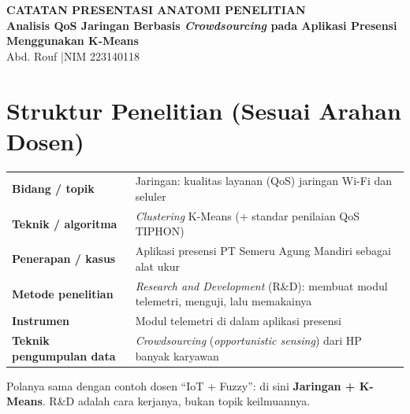 \documentclass[11pt,a4paper]{article}
\begin{document}
\begin{center}
{\Large\bfseries\color{head} CATATAN PRESENTASI ANATOMI PENELITIAN}\\[5pt]
{\bfseries Analisis QoS Jaringan Berbasis \textit{Crowdsourcing} pada Aplikasi Presensi Menggunakan K-Means}\\[6pt]
Abd. Rouf \quad|\quad NIM 223140118
\end{center}

\section{Struktur Penelitian (Sesuai Arahan Dosen)}
\begin{tabular}{@{}lp{11.5cm}@{}}
\textbf{Bidang / topik} & Jaringan: kualitas layanan (QoS) jaringan Wi-Fi dan seluler\\
\textbf{Teknik / algoritma} & \textit{Clustering} K-Means (+ standar penilaian QoS TIPHON)\\
\textbf{Penerapan / kasus} & Aplikasi presensi PT Semeru Agung Mandiri sebagai alat ukur\\
\textbf{Metode penelitian} & \textit{Research and Development} (R\&D): membuat modul telemetri, menguji, lalu memakainya\\
\textbf{Instrumen} & Modul telemetri di dalam aplikasi presensi\\
\textbf{Teknik pengumpulan data} & \textit{Crowdsourcing} (\textit{opportunistic sensing}) dari HP banyak karyawan\\
\end{tabular}

Polanya sama dengan contoh dosen ``IoT + Fuzzy'': di sini \textbf{Jaringan + K-Means}. R\&D adalah cara kerjanya, bukan topik keilmuannya.

\end{document}
